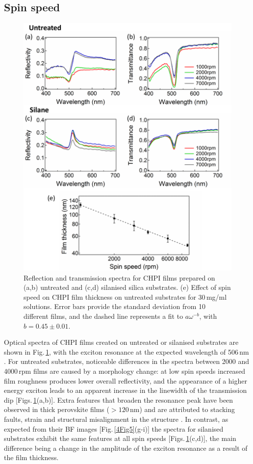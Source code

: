 \subsection{Spin speed}
\label{sec:4-5}
\begin{figure}[h!] 
\centering    
\includegraphics[width=\textwidth]{Fig6}
\caption{Reflection and transmission spectra for CHPI films prepared on (a,b) untreated and (c,d) silanised silica substrates. (e) Effect of spin speed on CHPI film thickness on untreated substrates for 30\,mg/ml solutions. Error bars provide the standard deviation from 10 different films, and the dashed line represents a fit to $a\omega^{-b}$, with $b=0.45\pm0.01$.}
\label{4Fig6}
\end{figure}
Optical spectra of CHPI films created on untreated or silanised substrates are shown in Fig.\,\ref{4Fig6}, with the exciton resonance at the expected wavelength of 506\,nm \cite{Pradeesh2009b}. For untreated substrates, noticeable differences in the spectra between 2000 and 4000\,rpm films are caused by a morphology change: at low spin speeds increased film roughness produces lower overall reflectivity, and the appearance of a higher energy exciton leads to an apparent increase in the linewidth of the transmission dip [Figs.\,\ref{4Fig6}(a,b)]. Extra features that broaden the resonance peak have been observed in thick perovskite films ($>120$\,nm) and are attributed to stacking faults, strain and structural misalignment in the structure \cite{VijayaPrakash2009}. In contrast, as expected from their BF images [Fig.\,\ref{4Fig5}(g-i)] the spectra for silanised substrates exhibit the same features at all spin speeds [Figs.\,\ref{4Fig6}(c,d)], the main difference being a change in the amplitude of the exciton resonance as a result of the film thickness. 

